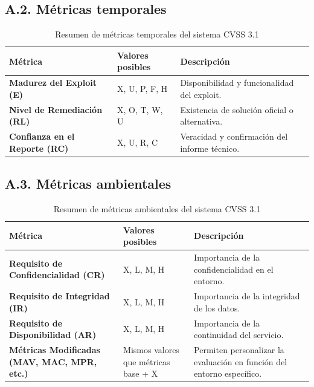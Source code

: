 \documentclass[a4paper, 11pt]{article}
\begin{document}
\vspace{1cm}

\subsection*{A.2. Métricas temporales}

\begin{table}[H]
\centering
\caption{Resumen de métricas temporales del sistema CVSS 3.1}
\label{tab:cvss_temporal_metrics}
\begin{tabular}{|p{4.5cm}|p{3.5cm}|p{7cm}|}
\hline
\rowcolor{gray!30}
\textbf{Métrica} & \textbf{Valores posibles} & \textbf{Descripción} \\ \hline
\textbf{Madurez del Exploit (E)} & X, U, P, F, H & Disponibilidad y funcionalidad del exploit. \\ \hline
\textbf{Nivel de Remediación (RL)} & X, O, T, W, U & Existencia de solución oficial o alternativa. \\ \hline
\textbf{Confianza en el Reporte (RC)} & X, U, R, C & Veracidad y confirmación del informe técnico. \\ \hline
\end{tabular}
\end{table}

\vspace{1cm}

\subsection*{A.3. Métricas ambientales}

\begin{table}[H]
\centering
\caption{Resumen de métricas ambientales del sistema CVSS 3.1}
\label{tab:cvss_environmental_metrics}
\begin{tabular}{|p{4.5cm}|p{3.5cm}|p{7cm}|}
\hline
\rowcolor{gray!30}
\textbf{Métrica} & \textbf{Valores posibles} & \textbf{Descripción} \\ \hline
\textbf{Requisito de Confidencialidad (CR)} & X, L, M, H & Importancia de la confidencialidad en el entorno. \\ \hline
\textbf{Requisito de Integridad (IR)} & X, L, M, H & Importancia de la integridad de los datos. \\ \hline
\textbf{Requisito de Disponibilidad (AR)} & X, L, M, H & Importancia de la continuidad del servicio. \\ \hline
\textbf{Métricas Modificadas (MAV, MAC, MPR, etc.)} & Mismos valores que métricas base + X & Permiten personalizar la evaluación en función del entorno específico. \\ \hline
\end{tabular}
\end{table}
\end{document}
